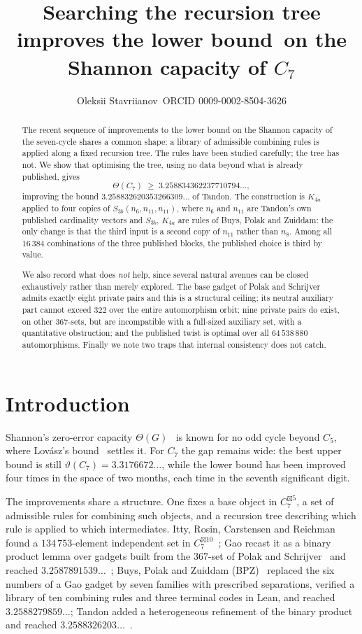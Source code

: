 \documentclass[11pt]{article}
\title{Searching the recursion tree improves the lower bound\ on the Shannon capacity of $C_7$}
\author{Oleksii Stavriianov\ \small ORCID 0009-0002-8504-3626}
\date{}
\theoremstyle{definition}
\begin{document}
\maketitle

\begin{abstract}
The recent sequence of improvements to the lower bound on the Shannon capacity of the seven-cycle
shares a common shape: a library of admissible combining rules is applied along a fixed recursion
tree. The rules have been studied carefully; the tree has not. We show that optimising the tree,
using no data beyond what is already published, gives
\[
  \Theta(C_7) \;\ge\; 3.258834362237710794\ldots,
\]
improving the bound $3.258832620353266309\ldots$ of Tandon. The construction is
$K_{4a}$ applied to four copies of $S_{3b}(n_6, n_{11}, n_{11})$, where $n_6$ and $n_{11}$ are
Tandon's own published cardinality vectors and $S_{3b}$, $K_{4a}$ are rules of Buys, Polak and
Zuiddam: the only change is that the third input is a second copy of $n_{11}$ rather than $n_8$.
Among all $16\,384$ combinations of the three published blocks, the published choice is third
by value.

We also record what does \emph{not} help, since several natural avenues can be closed
exhaustively rather than merely explored. The base gadget of Polak and Schrijver admits exactly
eight private pairs and this is a structural ceiling; its neutral auxiliary part cannot exceed
$322$ over the entire automorphism orbit; nine private pairs do exist, on other $367$-sets, but
are incompatible with a full-sized auxiliary set, with a quantitative obstruction; and the
published twist is optimal over all $64\,538\,880$ automorphisms. Finally we note two traps that
internal consistency does not catch.
\end{abstract}

\section{Introduction}

Shannon's zero-error capacity $\Theta(G)$~\cite{Shannon} is known for no odd cycle beyond $C_5$, where
Lov\'asz's bound~\cite{Lovasz} settles it. For $C_7$ the gap remains wide: the best upper bound is still
$\vartheta(C_7) = 3.3176672\ldots$, while the lower bound has been improved four times in the
space of two months, each time in the seventh significant digit.

The improvements share a structure. One fixes a base object in $C_7^{\boxtimes 5}$, a set of
admissible rules for combining such objects, and a recursion tree describing which rule is applied
to which intermediates. Itty, Rosin, Carstensen and Reichman found a $134\,753$-element independent set in
$C_7^{\boxtimes 10}$~\cite{Itty}; Gao recast it as a binary product lemma over
gadgets built from the $367$-set of Polak and Schrijver~\cite{PS} and reached
$3.2587891539\ldots$~\cite{Gao}; Buys, Polak and Zuiddam (BPZ)~\cite{BPZ1,BPZ2} replaced the six numbers of a Gao gadget by
seven families with prescribed separations, verified a library of ten combining rules and three
terminal codes in Lean, and reached $3.2588279859\ldots$; Tandon added a heterogeneous refinement
of the binary product and reached $3.2588326203\ldots$~\cite{Tandon}.
\end{document}
